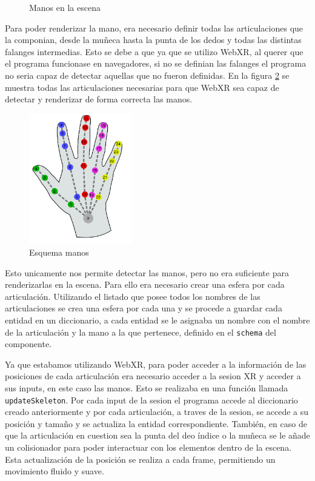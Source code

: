 \documentclass[a4paper, 12pt]{book}
\begin{document}
\begin{figure}[H] 
  \centering
  \fbox{\rule{0pt}{150pt} \rule{0.7\textwidth}{0pt}} 
  \caption{Manos en la escena}
  \label{fig:manos}
\end{figure}

Para poder renderizar la mano, era necesario definir todas las articulaciones que la componian, desde la muñeca hasta la punta de los dedos y todas las distintas falanges intermedias. Esto se debe a que ya que se utilizo WebXR, al querer que el programa funcionase en navegadores, si no se definian las falanges el programa no seria capaz de detectar aquellas que no fueron definidas.
En la figura \ref{fig:manos-esquema} se muestra todas las articulaciones necesarias para que WebXR sea capaz de detectar y renderizar de forma correcta las manos. 
\begin{figure}[H] 
  \centering
  \includegraphics[width=0.4\textwidth]{img/webxr-mano.png} 
  \caption{Esquema manos}
  \label{fig:manos-esquema}
\end{figure}

Esto unicamente nos permite detectar las manos, pero no era suficiente para renderizarlas en la escena. Para ello era necesario crear una esfera por cada articulación. Utilizando el listado que posee todos los nombres de las articulaciones se crea una esfera por cada una y se procede a guardar cada entidad en un diccionario, a cada entidad se le asignaba un nombre con el nombre de la articulación y la mano a la que pertenece, definido en el \texttt{schema} del componente.

Ya que estabamos utilizando WebXR, para poder acceder a la información de las posiciones de cada articulación era necesario acceder a la sesion XR y acceder a sus inputs, en este caso las manos. Esto se realizaba en una función llamada \texttt{updateSkeleton}. Por cada input de la sesion el programa accede al diccionario creado anteriormente y por cada articulación, a traves de la sesion, se accede a su posición y tamaño y se actualiza la entidad correspondiente. También, en caso de que la articulación en cuestion sea la punta del deo índice o la muñeca se le añade un colisionador para 
poder interactuar con los elementos dentro de la escena. Esta actualización de la posición se realiza a cada frame, permitiendo un movimiento fluido y suave. 
\end{document}
